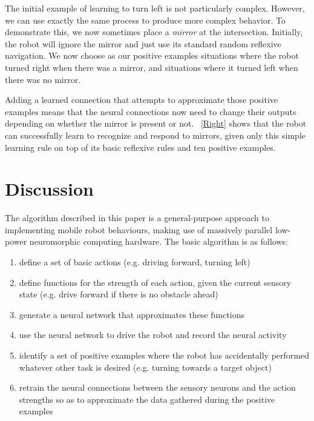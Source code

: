 \documentclass{frontiersSCNS}
\begin{document}
The initial example of learning to turn left is not particularly complex. 
However, we can use exactly the same process to produce more complex behavior.
To demonstrate this, we now sometimes place a \textit{mirror} at the intersection.
Initially, the robot will ignore the mirror and just use its standard random
reflexive navigation.  We now choose as our positive examples situations where
the robot turned right when there was a mirror, and situations where it turned
left when there was no mirror.

Adding a learned connection that attempts to approximate those positive
examples means that the neural connections now need to change their outputs
depending on whether the mirror is present or not.  \figurename~\ref{Right} shows 
that the robot can successfully learn to recognize and respond to mirrors,
given only this simple learning rule on top of its basic reflexive rules and
ten positive examples.

\section{Discussion}
The algorithm described in this paper is a general-purpose approach to
implementing mobile robot behaviours, 
making use of massively parallel low-power neuromorphic computing hardware. 
The basic algorithm is as follows:

\begin{enumerate}
\item define a set of basic actions (e.g. driving forward, turning left)
\item define functions for the strength of each action, given the
current sensory state (e.g. drive forward if there is no obstacle ahead)
\item generate a neural network that approximates these functions
\item use the neural network to drive the robot and record the neural activity
\item identify a set of positive examples where the robot has accidentally
performed whatever other task is desired (e.g. turning towards a target object)
\item retrain the neural connections between the sensory neurons and the
action strengths so as to approximate the data gathered during the positive
examples
\end{enumerate}
\end{document}
